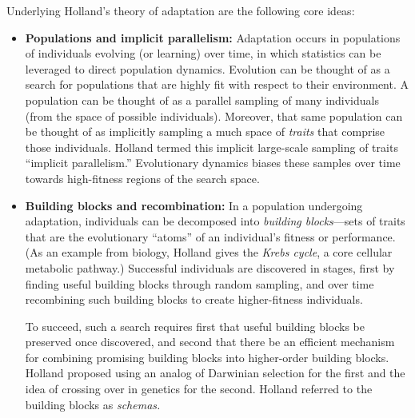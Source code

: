 \documentclass{sig-alternate}
\begin{document}
Underlying Holland's theory of adaptation are the following core ideas: 

\begin{itemize}
\item{\bf Populations and implicit parallelism:} Adaptation occurs in
  populations of individuals evolving (or learning) over time, in
  which statistics can be leveraged to direct population dynamics.
  Evolution can be thought of as a search for populations that are highly fit with respect to their environment.  
  A population can be thought of as a parallel sampling of many
  individuals (from the space of possible individuals).  Moreover,
  that same population can be thought of as implicitly sampling a much
  space of \emph{traits} that comprise those individuals.
  Holland termed this implicit large-scale sampling of traits ``implicit
  parallelism.''    Evolutionary dynamics biases these samples over time towards
  high-fitness regions of the search space.


\item{\bf Building blocks and recombination:} 
  In a population undergoing adaptation,
  individuals can be decomposed into \emph{building blocks}---sets of
  traits that are the evolutionary ``atoms'' of an individual's
  fitness or performance. (As an example from biology, Holland gives
  the \emph{Krebs cycle}, a core cellular metabolic
  pathway.)   Successful individuals
  are discovered in stages, first by finding useful
  building blocks through random sampling, and over
  time recombining such building blocks to create higher-fitness individuals. 



  To succeed, such a search requires first that
  useful building blocks be preserved once discovered, and second that
  there be an efficient mechanism for combining promising building
  blocks into higher-order building blocks.  Holland proposed using an
  analog of Darwinian selection for the first and the idea of crossing
  over in genetics for the second.  Holland referred to the building
  blocks as \emph{schemas.} 


\end{itemize}
\end{document}
